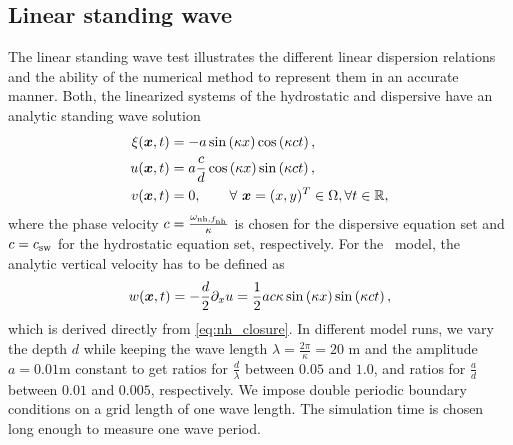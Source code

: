 \subsection{Linear standing wave}
The linear standing wave test illustrates the different linear dispersion relations and the ability of the numerical method to represent them in an accurate manner. 
Both, the linearized systems of the hydrostatic and dispersive have an analytic standing wave solution
\begin{align}
\xi(\boldsymbol{x},t)&=-a\sin\left(\kappa x \right)\cos\left(\kappa ct\right), \\
 u(\boldsymbol{x},t) &=a \frac{c}{d}\cos\left(\kappa x\right)\sin\left(\kappa ct\right), \\
 v(\boldsymbol{x},t) &=0, \qquad \forall \ \boldsymbol{x}=(x, y)^T \in \Omega, \forall t \in \mathbb{R},
\end{align}
where the phase velocity $c=\frac{\omega_{\text{nh,}f_{\text{nh}}}}{\kappa}$ is chosen for the dispersive equation set and $c=c_{\text{sw}}$ for the hydrostatic equation set, respectively. For the \nh\ model, the analytic vertical velocity has to be defined as
\[
w(\boldsymbol{x},t)=-\frac{d}{2}\partial_x u=\frac{1}{2}ac\kappa\sin\left(\kappa x \right)\sin\left(\kappa ct\right),
\]
which is derived directly from \eqref{eq:nh_closure}.
In different model runs, we vary the depth $d$ while keeping the wave length $\lambda=\frac{2\pi}{\kappa}=20$ m and the amplitude $a=0.01$m constant to get ratios for $\frac{d}{\lambda}$ between $0.05$ and $1.0$, and ratios for $\frac{a}{d}$ between $0.01$ and $0.005$, respectively.
We impose double periodic boundary conditions on a grid length of one wave length. The simulation time is chosen long enough to measure one wave period. 

